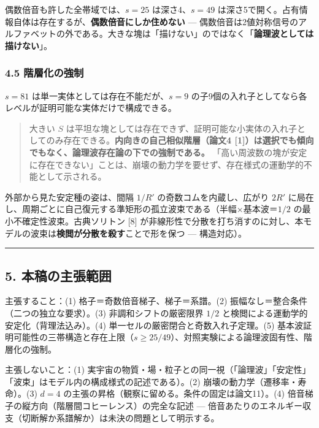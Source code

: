 \documentclass[
]{ltjsarticle}
\begin{document}
偶数倍音も許した全帯域では、\(s=25\) は深さ4、\(s=49\)
は深さ5で開く。占有情報自体は存在するが、\textbf{偶数倍音にしか住めない}
---
偶数倍音は2値対称信号のアルファベットの外である。大きな塊は「描けない」のではなく「\textbf{論理波としては描けない}」。

\subsubsection{4.5
階層化の強制}\label{ux968eux5c64ux5316ux306eux5f37ux5236}

\(s=81\) は単一実体としては存在不能だが、\(s=9\)
の子9個の入れ子としてなら各レベルが証明可能な実体だけで構成できる。

\begin{quote}
大きい \(S\)
は平坦な塊としては存在できず、証明可能な小実体の入れ子としてのみ存在できる。\textbf{内向きの自己相似階層（論文4
{[}1{]}）は選択でも傾向でもなく、論理波存在論の下での強制である。}
「高い周波数の塊が安定に存在できない」ことは、崩壊の動力学を要せず、存在様式の運動学的不能として示される。
\end{quote}

外部から見た安定種の姿は、間隔 \(1/R'\) の奇数コムを内蔵し、広がり
\(2R'\)
に局在し、周期ごとに自己復元する準矩形の孤立波束である（半幅×基本波＝\(1/2\)
の最小不確定性波束。古典ソリトン {[}8{]}
が非線形性で分散を打ち消すのに対し、本モデルの波束は\textbf{検閲が分散を殺す}ことで形を保つ
--- 構造対応）。

\begin{center}\rule{0.5\linewidth}{0.5pt}\end{center}

\subsection{5.
本稿の主張範囲}\label{ux672cux7a3fux306eux4e3bux5f35ux7bc4ux56f2}

主張すること：(1) 格子＝奇数倍音梯子、梯子＝系譜。(2)
振幅なし＝整合条件（二つの独立な要求）。(3) 非調和シフトの厳密限界
\(1/2\) と検閲による運動学的安定化（背理法込み）。(4)
単一セルの厳密閉合と奇数入れ子定理。(5)
基本波証明可能性の三帯構造と存在上限（\(s\ge25/49\)）、対照実験による論理波固有性、階層化の強制。

主張しないこと：(1)
実宇宙の物質・場・粒子との同一視（「論理波」「安定性」「波束」はモデル内の構成様式の記述である）。(2)
崩壊の動力学（遷移率・寿命）。(3) \(d=4\)
の主張の昇格（観察に留める。条件の固定は論文11）。(4)
倍音梯子の縦方向（階層間コヒーレンス）の完全な記述 ---
倍音あたりのエネルギー収支（切断解か系譜解か）は未決の問題として明示する。
\end{document}
